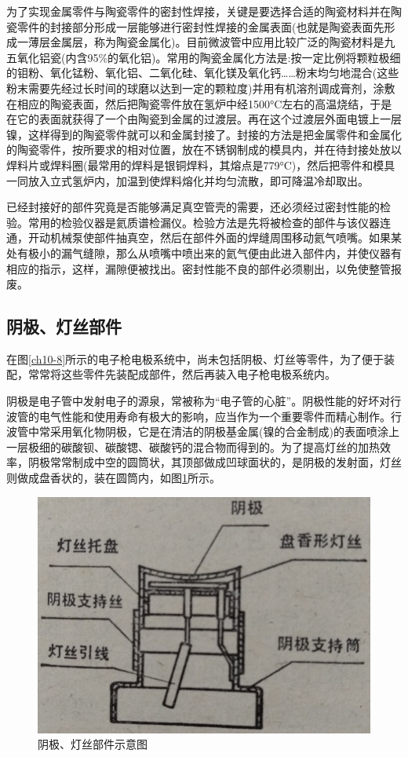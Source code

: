 为了实现金属零件与陶瓷零件的密封性焊接，关键是要选择合适的陶瓷材料并在陶瓷零件的封接部分形成一层能够进行密封性焊接的金属表面(也就是陶瓷表面先形成一薄层金属层，称为陶瓷金属化)。目前微波管中应用比较广泛的陶瓷材料是九五氧化铝瓷(内含95\%的氧化铝)。常用的陶瓷金属化方法是:按一定比例将颗粒极细的钼粉、氧化锰粉、氧化铝、二氧化硅、氧化镁及氧化钙……粉末均匀地混合(这些粉末需要先经过长时间的球磨以达到一定的颗粒度)并用有机溶剂调成膏剂，涂敷在相应的陶瓷表面，然后把陶瓷零件放在氢炉中经1500\si{\degreeCelsius}左右的高温烧结，于是在它的表面就获得了一个由陶瓷到金属的过渡层。再在这个过渡层外面电镀上一层镍，这样得到的陶瓷零件就可以和金属封接了。封接的方法是把金属零件和金属化的陶瓷零件，按所要求的相对位置，放在不锈钢制成的模具内，并在待封接处放以焊料片或焊料圈(最常用的焊料是银铜焊料，其熔点是779\si{\degreeCelsius})，然后把零件和模具一同放入立式氢炉内，加温到使焊料熔化并均匀流散，即可降温冷却取出。


已经封接好的部件究竟是否能够满足真空管壳的需要，还必须经过密封性能的检验。常用的检验仪器是氦质谱检漏仪。检验方法是先将被检查的部件与该仪器连通，开动机械泵使部件抽真空，然后在部件外面的焊缝周围移动氦气喷嘴。如果某处有极小的漏气缝隙，那么从喷嘴中喷出来的氦气便由此进入部件内，并使仪器有相应的指示，这样，漏隙便被找出。密封性能不良的部件必须剔出，以免使整管报废。
\subsection{阴极、灯丝部件}

在图\ref{ch10-8}所示的电子枪电极系统中，尚未包括阴极、灯丝等零件，为了便于装配，常常将这些零件先装配成部件，然后再装入电子枪电极系统内。


阴极是电子管中发射电子的源泉，常被称为“电子管的心脏”。阴极性能的好坏对行波管的电气性能和使用寿命有极大的影响，应当作为一个重要零件而精心制作。行波管中常采用氧化物阴极，它是在清洁的阴极基金属(镍的合金制成)的表面喷涂上一层极细的碳酸钡、碳酸锶、碳酸钙的混合物而得到的。为了提高灯丝的加热效率，阴极常常制成中空的圆筒状，其顶部做成凹球面状的，是阴极的发射面，灯丝则做成盘香状的，装在圆筒内，如图\ref{ch10-9}所示。
\begin{figure}[phtb]
	\centering
	\includegraphics[width=0.45\linewidth]{figure/ch10-9}
	\caption{ 阴极、灯丝部件示意图}
	\label{ch10-9}
\end{figure}

